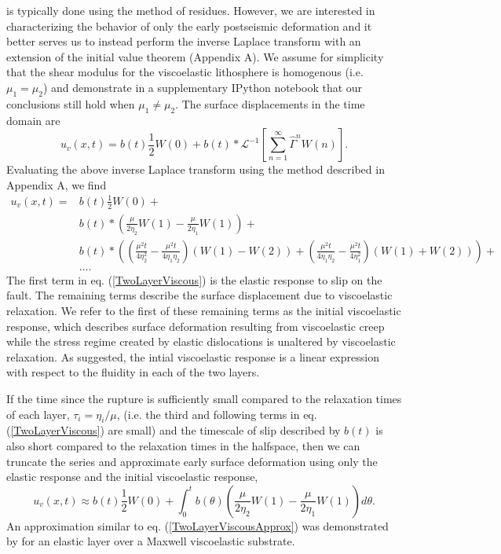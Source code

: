 \documentclass[extra,mreferee]{gji}
\begin{document}
is typically done using the method of residues. However, we are interested in characterizing
the behavior of only the early postseismic deformation and it better serves us
to instead perform the inverse Laplace transform with an extension of
the initial value theorem (Appendix A). We assume for simplicity that
the shear modulus for the viscoelastic lithosphere is homogenous
(i.e. $\mu_1 = \mu_2$) and demonstrate in a supplementary IPython
notebook that our conclusions still hold when $\mu_1 \neq \mu_2$.  The
surface displacements in the time domain are
\begin{equation}
 u_v(x,t) = b(t)\frac{1}{2}W(0) + 
            b(t)\ast\mathcal{L}^{-1}\left[\sum_{n=1}^\infty\hat{\Gamma}^{n}W(n)\right].
\end{equation}
Evaluating the above inverse Laplace transform using the method
described in Appendix A, we find 
\begin{align}\label{TwoLayerViscous}
  u_v(x,t) = &b(t)\frac{1}{2}W(0) +\nonumber\\
             &b(t)\ast\left(\frac{\mu}{2\eta_2}W(1) - \frac{\mu}{2\eta_1}W(1)\right) +\nonumber\\
             &b(t)\ast\left(\left(\frac{\mu^2t}{4\eta_2^2} -
                  \frac{\mu^2t}{4\eta_1\eta_2}\right) \left(W(1) - W(2)\right) +
                  \left(\frac{\mu^2t}{4\eta_1\eta_2} - \frac{\mu^2t}{4\eta_1^2}\right)
                  \left(W(1) + W(2)\right)\right) + \nonumber\\ 
             &\dots.
\end{align}
The first term in eq. (\ref{TwoLayerViscous}) is the elastic response
to slip on the fault.  The remaining terms describe the surface
displacement due to viscoelastic relaxation.  We refer to the first of
these remaining terms as the initial viscoelastic response, which
describes surface deformation resulting from viscoelastic creep while
the stress regime created by elastic dislocations is unaltered by
viscoelastic relaxation. As suggested, the intial viscoelastic
response is a linear expression with respect to the fluidity in each
of the two layers.

If the time since the rupture is sufficiently small compared to the
relaxation times of each layer, $\tau_i=\eta_i/\mu$, (i.e. the third
and following terms in eq. (\ref{TwoLayerViscous}) are small) and the
timescale of slip described by $b(t)$ is also short compared to the
relaxation times in the halfspace, then we can truncate the series and
approximate early surface deformation using only the elastic response
and the initial viscoelastic response,
\begin{equation}\label{TwoLayerViscousApprox}
 u_v(x,t) \approx b(t)\frac{1}{2}W(0) + 
          \int_0^t b(\theta)\left(\frac{\mu}{2\eta_2}W(1) - 
                  \frac{\mu}{2\eta_1}W(1)\right)d\theta.
\end{equation} 
An approximation similar to eq. (\ref{TwoLayerViscousApprox}) was
demonstrated by \citet{S2010} for an elastic layer over a Maxwell
viscoelastic substrate. 
\end{document}
